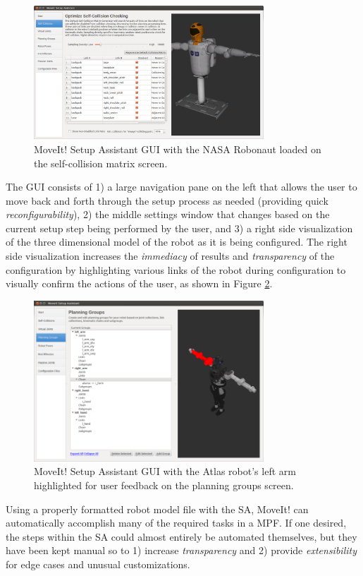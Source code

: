 \documentclass[10pt,journal,compsoc]{joser1}
\begin{document}
{\begin{figure}[!t]
\centering
\includegraphics[width=3.4in]{coleman_20131110_f06}
\caption{MoveIt! Setup Assistant GUI with the NASA Robonaut loaded on the
self-collision matrix screen.}
\label{fig:setupassistant}
\end{figure}

The GUI consists of 1) a large navigation pane on the left that allows the user
to move back and forth through the setup process as needed (providing quick
\textit{reconfigurability}), 2) the middle settings window that changes based on
the current setup step being performed by the user, and 3) a right side
visualization of the three dimensional model of the robot as it is being
configured. The right side visualization increases the \textit{immediacy} of
results and \textit{transparency} of the configuration by highlighting various
links of the robot during configuration to visually confirm the actions of the
user, as shown in Figure \ref{fig:setupassistant3}.

\begin{figure}[!t]
\centering
\includegraphics[width=3.4in]{coleman_20131110_f07}
\caption{MoveIt! Setup Assistant GUI with the Atlas robot's left arm highlighted
for user feedback on the planning groups screen.}
\label{fig:setupassistant3}	
\end{figure}

Using a properly formatted robot model file with the SA, MoveIt! can
automatically accomplish many of the required tasks in a MPF. If one desired,
the steps within the SA could almost entirely be automated themselves, but they
have been kept manual so to 1) increase \textit{transparency} and 2) provide
\textit{extensibility} for edge cases and unusual customizations.

}
\end{document}
